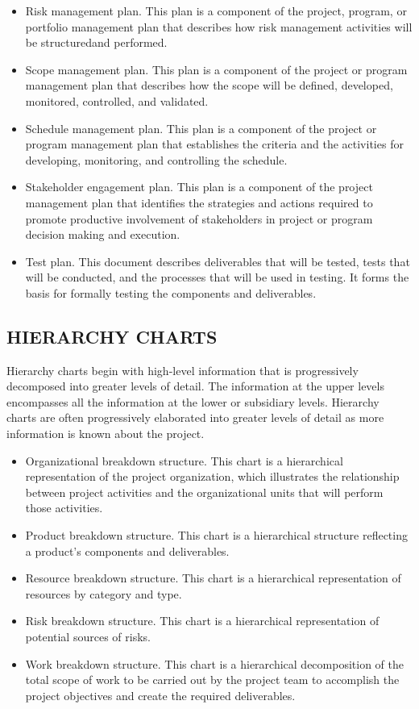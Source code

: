 \documentclass[11pt]{article}
\begin{document}
\begin{itemize}
\item Risk management plan. This plan is a component of the project, program, or portfolio management plan that describes how risk management activities will be structuredand performed.
\item Scope management plan. This plan is a component of the project or program management plan that describes how the scope will be defined, developed, monitored, controlled, and validated.
\item Schedule management plan. This plan is a component of the project or program management plan that establishes the criteria and the activities for developing, monitoring, and controlling the schedule.
\item Stakeholder engagement plan. This plan is a component of the project management plan that identifies the strategies and actions required to promote productive involvement of stakeholders in project or program decision making and execution.
\item Test plan. This document describes deliverables that will be tested, tests that will be conducted, and the processes that will be used in testing. It forms the basis for formally testing the components and deliverables.
\end{itemize}

\subsection{HIERARCHY CHARTS}
\label{sec:orgb40105f}
Hierarchy charts begin with high-level information that is progressively decomposed into greater levels of detail. The information at the upper levels encompasses all the information at the lower or subsidiary levels. Hierarchy charts are often progressively elaborated into greater levels of detail as more information is known about the project.
\begin{itemize}
\item Organizational breakdown structure. This chart is a hierarchical representation of the project organization, which illustrates the relationship between project activities and the organizational units that will perform those activities.
\item Product breakdown structure. This chart is a hierarchical structure reflecting a product’s components and deliverables.
\item Resource breakdown structure. This chart is a hierarchical representation of resources by category and type.
\item Risk breakdown structure. This chart is a hierarchical representation of potential sources of risks.
\item Work breakdown structure. This chart is a hierarchical decomposition of the total scope of work to be carried out by the project team to accomplish the project objectives and create the required deliverables.
\end{itemize}
\end{document}
